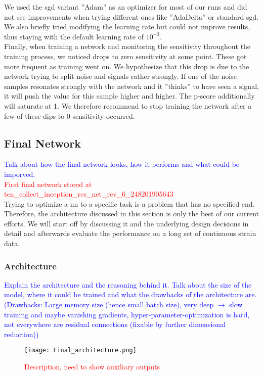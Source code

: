 We used the \gls{sgd} variant ''Adam'' as an optimizer for most of our runs and did not see improvements when trying different ones like ''AdaDelta'' or standard \gls{sgd}. We also briefly tried modifying the learning rate but could not improve results, thus staying with the default learning rate of $10^{-3}$.\\
Finally, when training a network and monitoring the sensitivity throughout the training process, we noticed drops to zero sensitivity at some point. These got more frequent as training went on. We hypothesize that this drop is due to the network trying to split noise and signals rather strongly. If one of the noise samples resonates strongly with the network and it ''thinks'' to have seen a signal, it will push the value for this sample higher and higher. The p-score additionally will saturate at 1. We therefore recommend to stop training the network after a few of these dips to 0 sensitivity occurred.


\subsection{Final Network}
\textcolor{blue}{Talk about how the final network looks, how it performs and what could be imporved.}\\
\textcolor{red}{First final network stored at tcn\_collect\_inception\_res\_net\_rev\_6\_248201905643}\\
Trying to optimize a \gls{nn} to a specific task is a problem that has no specified end. Therefore, the architecture discussed in this section is only the best of our current efforts. We will start off by discussing it and the underlying design decisions in detail and afterwards evaluate the performance on a long set of continuous strain data.
\subsubsection{Architecture}\label{sec:final_architecture}
\textcolor{blue}{Explain the architecture and the reasoning behind it. Talk about the size of the model, where it could be trained and what the drawbacks of the architecture are. (Drawbacks: Large memory size (hence small batch size), very deep $\to$ slow training and maybe vanishing gradients, hyper-parameter-optimization is hard, not everywhere are residual connections (fixable by further dimensional reduction))}\\
\begin{figure}
\centering
\texttt{[image: Final\_architecture.png]}
\caption[Overview final architecture]{\textcolor{red}{Description, need to show auxiliary outputs}}
\end{figure}
